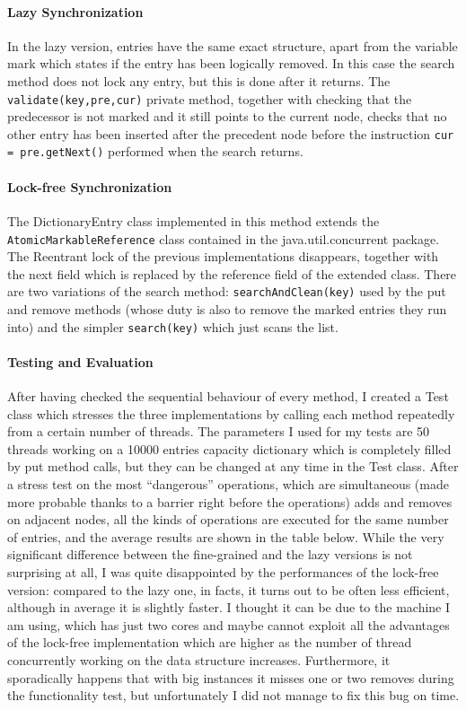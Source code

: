 \documentclass[a4paper]{article}
\begin{document}
\paragraph{Lazy Synchronization}
In the lazy version, entries have the same exact structure, apart from the variable mark which states if the entry has been logically removed. In this case the search method does not lock any entry, but this is done after it returns. The \texttt{validate(key,pre,cur)} private method, together with checking that the predecessor is not marked and it still points to the current node, checks that no other entry has been inserted after the precedent node before the instruction \texttt{cur =  pre.getNext()} performed when the search returns.

\paragraph{Lock-free Synchronization}
The DictionaryEntry class implemented in this method extends the \texttt{AtomicMarkableReference} class contained in the java.util.concurrent package. The Reentrant lock of the previous implementations disappears, together with the next field which is replaced by the reference field of the extended class. There are two variations of the search method: \texttt{searchAndClean(key)} used by the put and remove methods (whose duty is also to remove the marked entries they run into) and the simpler \texttt{search(key)} which just scans the list.

\paragraph{Testing and Evaluation}
After having checked the sequential behaviour of every method, I created a Test class which stresses the three implementations by calling each method repeatedly from a certain number of threads. The parameters I used for my tests are 50 threads working on a 10000 entries capacity dictionary which is completely filled by put method calls, but they can be changed at any time in the Test class. After a stress test on the most ``dangerous'' operations, which are simultaneous (made more probable thanks to a barrier right before the operations) adds and removes on adjacent nodes, all the kinds of operations are executed for the same number of entries, and the average results are shown in the table below. While the very significant difference between the fine-grained and the lazy versions is not surprising at all, I was quite disappointed by the performances of the lock-free version: compared to the lazy one, in facts, it turns out to be often less efficient, although in average it is slightly faster. I thought it can be due to the machine I am using, which has just two cores and maybe cannot exploit all the advantages of the lock-free implementation which are higher as the number of thread concurrently working on the data structure increases. Furthermore, it sporadically happens that with big instances it misses one or two removes during the functionality test, but unfortunately I did not manage to fix this bug on time.
\end{document}
